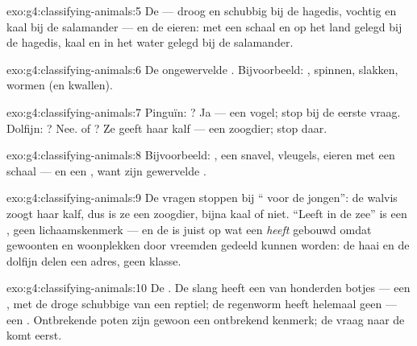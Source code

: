 \begin{solution}{exo:g4:classifying-animals:5}
De  --- droog en schubbig bij de hagedis, vochtig en kaal bij de
salamander --- en de eieren: met een schaal en op het land gelegd bij
de hagedis, kaal en in het water gelegd bij de salamander.
\end{solution}

\begin{solution}{exo:g4:classifying-animals:6}
De ongewervelde . Bijvoorbeeld: , spinnen, slakken,
wormen (en kwallen).
\end{solution}

\begin{solution}{exo:g4:classifying-animals:7}
Pinguïn: ? Ja --- een vogel; stop bij de eerste vraag. Dolfijn:
? Nee.  of ? Ze geeft haar kalf  --- een zoogdier;
stop daar.
\end{solution}

\begin{solution}{exo:g4:classifying-animals:8}
Bijvoorbeeld: , een snavel, vleugels, eieren met een schaal --- en
een , want  zijn gewervelde .
\end{solution}

\begin{solution}{exo:g4:classifying-animals:9}
De vragen stoppen bij `` voor de jongen'': de walvis zoogt haar
kalf, dus is ze een zoogdier, bijna kaal of niet. ``Leeft in de zee''
is een , geen lichaamskenmerk --- en de  is juist
op wat een  \emph{heeft} gebouwd omdat gewoonten en woonplekken
door vreemden gedeeld kunnen worden: de haai en de dolfijn delen een
adres, geen klasse.
\end{solution}

\begin{solution}{exo:g4:classifying-animals:10}
De . De slang heeft een  van honderden botjes ---
een , met de droge schubbige  van een reptiel; de
regenworm heeft helemaal geen  --- een .
Ontbrekende poten zijn gewoon een ontbrekend kenmerk; de vraag naar de
 komt eerst.
\end{solution}

